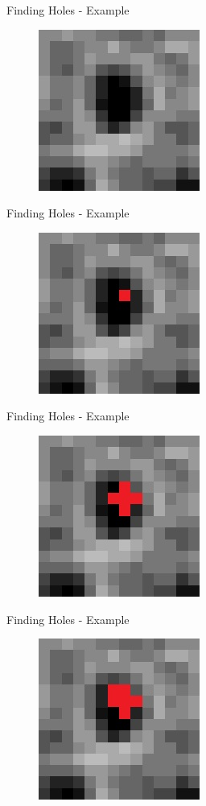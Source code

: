 \documentclass{beamer}
\begin{document}
\begin{frame}{Finding Holes - Example}
	\begin{figure}
		\includegraphics[height=150pt]{images/image38.jpg}
	\end{figure}
\end{frame}
\begin{frame}{Finding Holes - Example}
	\begin{figure}
		\includegraphics[height=150pt]{images/image39.jpg}
	\end{figure}
\end{frame}
\begin{frame}{Finding Holes - Example}
	\begin{figure}
		\includegraphics[height=150pt]{images/image40.jpg}
	\end{figure}
\end{frame}
\begin{frame}{Finding Holes - Example}
	\begin{figure}
		\includegraphics[height=150pt]{images/image41.jpg}
	\end{figure}
\end{frame}
\end{document}
